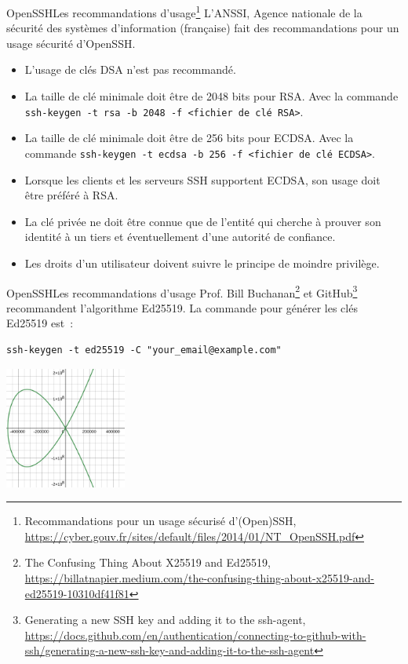 \documentclass{beamer}
\begin{document}
    \begin{frame}{OpenSSH}{Les recommandations d'usage\footnote{\label{openssh-anssi}Recommandations pour un usage sécurisé d’(Open)SSH, \url{https://cyber.gouv.fr/sites/default/files/2014/01/NT_OpenSSH.pdf}}}
        L'ANSSI, Agence nationale de la sécurité des systèmes d’information (française) fait des recommandations pour un usage sécurité d'OpenSSH.
        \bigbreak
        \begin{itemize}
            \item L’usage de clés DSA n’est pas recommandé.
            \item La taille de clé minimale doit être de 2048 bits pour RSA.
            Avec la commande \lstinline{ssh-keygen -t rsa -b 2048 -f <fichier de clé RSA>}.
            \item La taille de clé minimale doit être de 256 bits pour ECDSA.
            Avec la commande \lstinline{ssh-keygen -t ecdsa -b 256 -f <fichier de clé ECDSA>}.
            \item Lorsque les clients et les serveurs SSH supportent ECDSA, son usage doit être préféré à RSA.
            \item La clé privée ne doit être connue que de l’entité qui cherche à prouver son identité à un tiers et éventuellement d’une autorité de confiance.
            \item Les droits d’un utilisateur doivent suivre le principe de moindre privilège.
        \end{itemize}
    \end{frame}

    \begin{frame}[fragile]{OpenSSH}{Les recommandations d'usage}
        Prof. Bill Buchanan\footnote{The Confusing Thing About X25519 and Ed25519, \url{https://billatnapier.medium.com/the-confusing-thing-about-x25519-and-ed25519-10310df41f81}} et GitHub\footnote{Generating a new SSH key and adding it to the ssh-agent, \url{https://docs.github.com/en/authentication/connecting-to-github-with-ssh/generating-a-new-ssh-key-and-adding-it-to-the-ssh-agent}} recommandent l'algorithme Ed25519.
        \bigbreak
        La commande pour générer les clés Ed25519 est~:
        \begin{lstlisting}
ssh-keygen -t ed25519 -C "your_email@example.com"
        \end{lstlisting}
        \begin{center}
            \includegraphics[width=4cm]{image/Ed25519-curve}
        \end{center}
    \end{frame}
\end{document}
